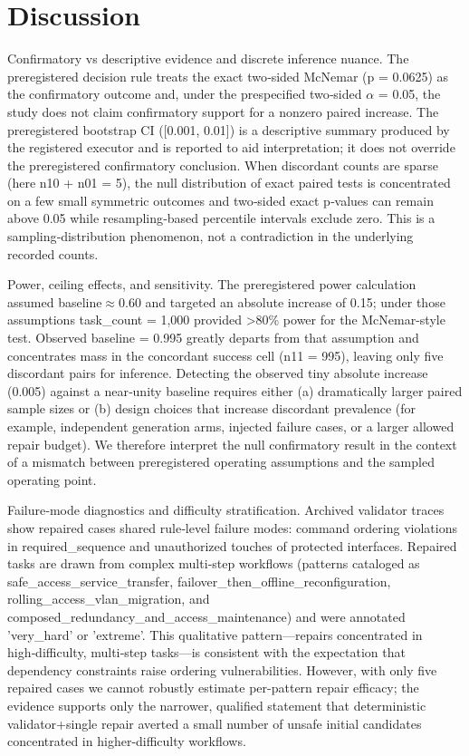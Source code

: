 \documentclass[conference]{IEEEtran}
\begin{document}
\section{Discussion}
Confirmatory vs descriptive evidence and discrete inference nuance. The preregistered decision rule treats the exact two‑sided McNemar (p = 0.0625) as the confirmatory outcome and, under the prespecified two‑sided \ensuremath{\alpha} = 0.05, the study does not claim confirmatory support for a nonzero paired increase. The preregistered bootstrap CI ([0.001, 0.01]) is a descriptive summary produced by the registered executor and is reported to aid interpretation; it does not override the preregistered confirmatory conclusion. When discordant counts are sparse (here n10 + n01 = 5), the null distribution of exact paired tests is concentrated on a few small symmetric outcomes and two‑sided exact p‑values can remain above 0.05 while resampling‑based percentile intervals exclude zero. This is a sampling‑distribution phenomenon, not a contradiction in the underlying recorded counts.

Power, ceiling effects, and sensitivity. The preregistered power calculation assumed baseline\ensuremath{\approx}0.60 and targeted an absolute increase of 0.15; under those assumptions task\_count = 1,000 provided >80\% power for the McNemar-style test. Observed baseline = 0.995 greatly departs from that assumption and concentrates mass in the concordant success cell (n11 = 995), leaving only five discordant pairs for inference. Detecting the observed tiny absolute increase (0.005) against a near‑unity baseline requires either (a) dramatically larger paired sample sizes or (b) design choices that increase discordant prevalence (for example, independent generation arms, injected failure cases, or a larger allowed repair budget). We therefore interpret the null confirmatory result in the context of a mismatch between preregistered operating assumptions and the sampled operating point.

Failure‑mode diagnostics and difficulty stratification. Archived validator traces show repaired cases shared rule‑level failure modes: command ordering violations in required\_sequence and unauthorized touches of protected interfaces. Repaired tasks are drawn from complex multi‑step workflows (patterns cataloged as safe\_access\_service\_transfer, failover\_then\_offline\_reconfiguration, rolling\_access\_vlan\_migration, and composed\_redundancy\_and\_access\_maintenance) and were annotated 'very\_hard' or 'extreme'. This qualitative pattern---repairs concentrated in high‑difficulty, multi‑step tasks---is consistent with the expectation that dependency constraints raise ordering vulnerabilities. However, with only five repaired cases we cannot robustly estimate per-pattern repair efficacy; the evidence supports only the narrower, qualified statement that deterministic validator+single repair averted a small number of unsafe initial candidates concentrated in higher‑difficulty workflows.
\end{document}
